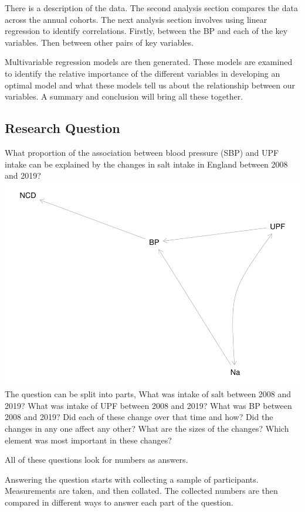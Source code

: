 \documentclass[
]{article}
\begin{document}
There is a description of the data. The second analysis section compares
the data across the annual cohorts. The next analysis section involves
using linear regression to identify correlations. Firstly, between the
BP and each of the key variables. Then between other pairs of key
variables.

Multivariable regression models are then generated. These models are
examined to identify the relative importance of the different variables
in developing an optimal model and what these models tell us about the
relationship between our variables. A summary and conclusion will bring
all these together.

\hypertarget{research-question}{%
\subsection{Research Question}\label{research-question}}

What proportion of the association between blood pressure (SBP) and UPF
intake can be explained by the changes in salt intake in England between
2008 and 2019?
\includegraphics{methodandresults_files/figure-latex/fig-dagupfbp2-1.pdf}
The question can be split into parts, What was intake of salt between
2008 and 2019? What was intake of UPF between 2008 and 2019? What was BP
between 2008 and 2019? Did each of these change over that time and how?
Did the changes in any one affect any other? What are the sizes of the
changes? Which element was most important in these changes?

All of these questions look for numbers as answers.

Answering the question starts with collecting a sample of participants.
Measurements are taken, and then collated. The collected numbers are
then compared in different ways to answer each part of the question.
\end{document}
